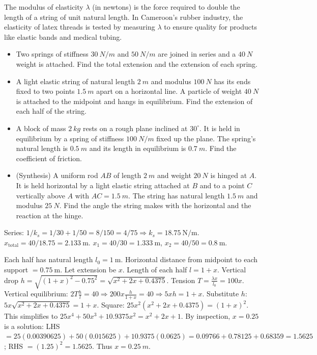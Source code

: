 \documentclass[11pt]{article}
\begin{document}
\begin{savaistu}
The modulus of elasticity \(\lambda\) (in newtons) is the force required to double the length of a string of unit natural length. In Cameroon's rubber industry, the elasticity of latex threads is tested by measuring \(\lambda\) to ensure quality for products like elastic bands and medical tubing.
\end{savaistu}

\begin{exercice}
\begin{itemize}
\item Two springs of stiffness \(\SI{30}{N/m}\) and \(\SI{50}{N/m}\) are joined in series and a \(\SI{40}{N}\) weight is attached. Find the total extension and the extension of each spring.
\item A light elastic string of natural length \(\SI{2}{m}\) and modulus \(\SI{100}{N}\) has its ends fixed to two points \(\SI{1.5}{m}\) apart on a horizontal line. A particle of weight \(\SI{40}{N}\) is attached to the midpoint and hangs in equilibrium. Find the extension of each half of the string.
\item A block of mass \(\SI{2}{kg}\) rests on a rough plane inclined at \(30^\circ\). It is held in equilibrium by a spring of stiffness \(\SI{100}{N/m}\) fixed up the plane. The spring's natural length is \(\SI{0.5}{m}\) and its length in equilibrium is \(\SI{0.7}{m}\). Find the coefficient of friction.
\item (Synthesis) A uniform rod \(AB\) of length \(\SI{2}{m}\) and weight \(\SI{20}{N}\) is hinged at \(A\). It is held horizontal by a light elastic string attached at \(B\) and to a point \(C\) vertically above \(A\) with \(AC = \SI{1.5}{m}\). The string has natural length \(\SI{1.5}{m}\) and modulus \(\SI{25}{N}\). Find the angle the string makes with the horizontal and the reaction at the hinge.
\end{itemize}
\end{exercice}

\begin{corrige}[Exercise 1]
Series: \(1/k_s = 1/30 + 1/50 = 8/150 = 4/75 \Rightarrow k_s = 18.75\ \mathrm{N/m}\). \(x_{\text{total}} = 40/18.75 = 2.133\ \mathrm{m}\). \(x_1 = 40/30 = 1.333\ \mathrm{m}\), \(x_2 = 40/50 = 0.8\ \mathrm{m}\).
\end{corrige}

\begin{corrige}[Exercise 2]
Each half has natural length \(l_0 = 1\ \mathrm{m}\). Horizontal distance from midpoint to each support \(= 0.75\ \mathrm{m}\). Let extension be \(x\). Length of each half \(l = 1+x\). Vertical drop \(h = \sqrt{(1+x)^2 - 0.75^2} = \sqrt{x^2+2x+0.4375}\). Tension \(T = \frac{\lambda x}{l_0} = 100x\). Vertical equilibrium: \(2T\frac{h}{l} = 40 \Rightarrow 200x\frac{h}{1+x}=40 \Rightarrow 5x h = 1+x\). Substitute \(h\): \(5x\sqrt{x^2+2x+0.4375} = 1+x\). Square: \(25x^2(x^2+2x+0.4375) = (1+x)^2\). This simplifies to \(25x^4+50x^3+10.9375x^2 = x^2+2x+1\). By inspection, \(x=0.25\) is a solution: LHS \(=25(0.00390625)+50(0.015625)+10.9375(0.0625)=0.09766+0.78125+0.68359=1.5625\); RHS \(=(1.25)^2=1.5625\). Thus \(x = \SI{0.25}{m}\).
\end{corrige}
\end{document}
